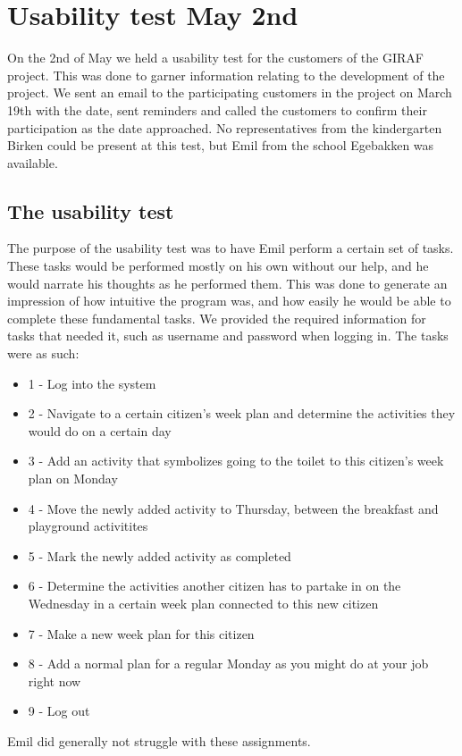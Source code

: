 \section{Usability test May 2nd}
On the 2nd of May we held a usability test for the customers of the GIRAF project.
This was done to garner information relating to the development of the project.
We sent an email to the participating customers in the project on March 19th with the date, sent reminders and called the customers to confirm their participation as the date approached.
No representatives from the kindergarten Birken could be present at this test, but Emil from the school Egebakken was available.

\subsection{The usability test}
The purpose of the usability test was to have Emil perform a certain set of tasks.
These tasks would be performed mostly on his own without our help, and he would narrate his thoughts as he performed them.
This was done to generate an impression of how intuitive the program was, and how easily he would be able to complete these fundamental tasks.
We provided the required information for tasks that needed it, such as username and password when logging in. 
The tasks were as such:
\begin{itemize}
    \item 1 - Log into the system
    \item 2 - Navigate to a certain citizen's week plan and determine the activities they would do on a certain day
    \item 3 - Add an activity that symbolizes going to the toilet to this citizen's week plan on Monday
    \item 4 - Move the newly added activity to Thursday, between the breakfast and playground activitites
    \item 5 - Mark the newly added activity as completed
    \item 6 - Determine the activities another citizen has to partake in on the Wednesday in a certain week plan connected to this new citizen
    \item 7 - Make a new week plan for this citizen
    \item 8 - Add a normal plan for a regular Monday as you might do at your job right now
    \item 9 - Log out 
\end{itemize}
\noindent
Emil did generally not struggle with these assignments.
